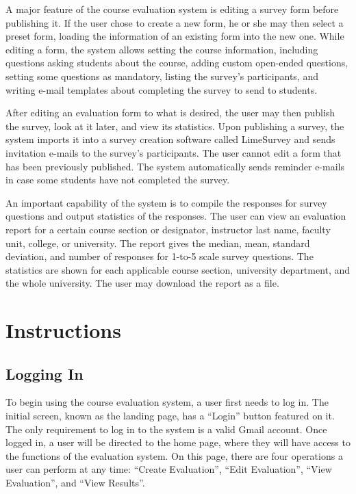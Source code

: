 \documentclass{article}
\begin{document}
A major feature of the course evaluation system is editing a survey form before publishing it. If the user chose to create a new form, he or she may then select a preset form, loading the information of an existing form into the new one. While editing a form, the system allows setting the course information, including questions asking students about the course, adding custom open-ended questions, setting some questions as mandatory, listing the survey's participants, and writing e-mail templates about completing the survey to send to students.

After editing an evaluation form to what is desired, the user may then publish the survey, look at it later, and view its statistics. Upon publishing a survey, the system imports it into a survey creation software called LimeSurvey and sends invitation e-mails to the survey's participants. The user cannot edit a form that has been previously published. The system automatically sends reminder e-mails in case some students have not completed the survey.

An important capability of the system is to compile the responses for survey questions and output statistics of the responses. The user can view an evaluation report for a certain course section or designator, instructor last name, faculty unit, college, or university. The report gives the median, mean, standard deviation, and number of responses for 1-to-5 scale survey questions. The statistics are shown for each applicable course section, university department, and the whole university. The user may download the report as a file.

\section{Instructions}

\subsection{Logging In}

To begin using the course evaluation system, a user first needs to log in. The initial screen, known as the landing page, has a ``Login'' button featured on it. The only requirement to log in to the system is a valid Gmail account. Once logged in, a user will be directed to the home page, where they will have access to the functions of the evaluation system. On this page, there are four operations a user can perform at any time: ``Create Evaluation'', ``Edit Evaluation'', ``View Evaluation'', and ``View Results''.
\end{document}
